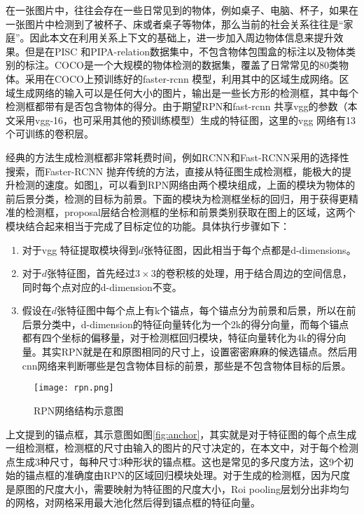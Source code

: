 在一张图片中，往往会存在一些日常见到的物体，例如桌子、电脑、杯子，如果在一张图片中检测到了被杯子、床或者桌子等物体，那么当前的社会关系往往是``家庭''。因此本文在利用关系上下文的基础上，进一步加入周边物体信息来提升效果。但是在PISC 和PIPA-relation数据集中，不包含物体包围盒的标注以及物体类别的标注。COCO\cite{lin2014microsoft}是一个大规模的物体检测的数据集，覆盖了日常常见的80类物体。采用在COCO上预训练好的faster-rcnn 模型，利用其中的区域生成网络。区域生成网络的输入可以是任何大小的图片，输出是一些长方形的检测框，其中每个检测框都带有是否包含物体的得分。由于期望RPN和fast-rcnn 共享vgg\cite{simonyan2015very}的参数（本文采用vgg-16，也可采用其他的预训练模型）生成的特征图，这里的vgg 网络有13个可训练的卷积层。

经典的方法生成检测框都非常耗费时间，例如RCNN和Fast-RCNN采用的选择性搜索，而Faster-RCNN 抛弃传统的方法，直接从特征图生成检测框，能极大的提升检测的速度。如图\ref{fig:rpn}，可以看到RPN网络由两个模块组成，上面的模块为物体的前后景分类，检测的目标为前景。下面的模块为检测框坐标的回归，用于获得更精准的检测框，proposal层结合检测框的坐标和前景类别获取在图上的区域，这两个模块结合起来相当于完成了目标定位的功能。具体执行步骤如下：
\begin{enumerate}
    \item 对于vgg 特征提取模块得到$d$张特征图，因此相当于每个点都是d-dimensions。
    \item 对于$d$张特征图，首先经过$3 \times 3$的卷积核的处理，用于结合周边的空间信息，同时每个点对应的d-dimension不变。
    \item 假设在$d$张特征图中每个点上有k个锚点，每个锚点分为前景和后景，所以在前后景分类中，d-dimension的特征向量转化为一个2k的得分向量，而每个锚点都有四个坐标的偏移量，对于检测框回归模块，特征向量转化为4k的得分向量。其实RPN就是在和原图相同的尺寸上，设置密密麻麻的候选锚点。然后用cnn网络来判断哪些是包含物体目标的前景，那些是不包含物体目标的后景。
\end{enumerate}
\begin{figure}[htpb]
	\centering
	\texttt{[image: rpn.png]}
    \caption{RPN网络结构示意图}
	\vspace*{-3.5mm}
	\label{fig:rpn}
\end{figure}
上文提到的锚点框，其示意图如图\ref{fig:anchor}，其实就是对于特征图的每个点生成一组检测框，检测框的尺寸由输入的图片的尺寸决定的，在本文中，对于每个检测点生成3种尺寸，每种尺寸3种形状的锚点框。这也是常见的多尺度方法，这9个初始的锚点框的准确度由RPN的区域回归模块处理。对于生成的检测框，因为尺度是原图的尺度大小，需要映射为特征图的尺度大小，Roi pooling层划分出非均匀的网格，对网格采用最大池化然后得到锚点框的特征向量。
